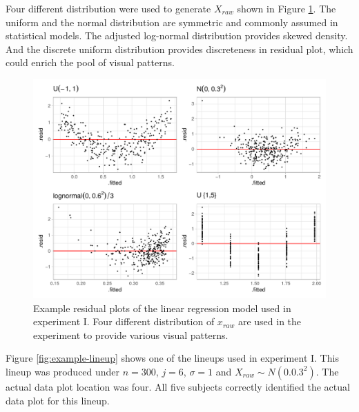 \documentclass[]{interact}
\theoremstyle{plain}%
\theoremstyle{definition}
\theoremstyle{remark}
\begin{document}
Four different distribution were used to generate \(X_{raw}\) shown in
Figure \ref{fig:different-dist}. The uniform and the normal distribution
are symmetric and commonly assumed in statistical models. The adjusted
log-normal distribution provides skewed density. And the discrete
uniform distribution provides discreteness in residual plot, which could
enrich the pool of visual patterns.

\begin{figure}
\includegraphics[width=1\linewidth]{paper_comparison_files/figure-latex/different-dist-1} \caption{Example residual plots of the linear regression model used in experiment I. Four different distribution of $x_{raw}$ are used in the experiment to provide various visual patterns.}\label{fig:different-dist}
\end{figure}

Figure \ref{fig:example-lineup} shows one of the lineups used in
experiment I. This lineup was produced under \(n = 300\), \(j = 6\),
\(\sigma = 1\) and \(X_{raw} \sim N(0.0.3^2)\). The actual data plot
location was four. All five subjects correctly identified the actual
data plot for this lineup.
\end{document}
